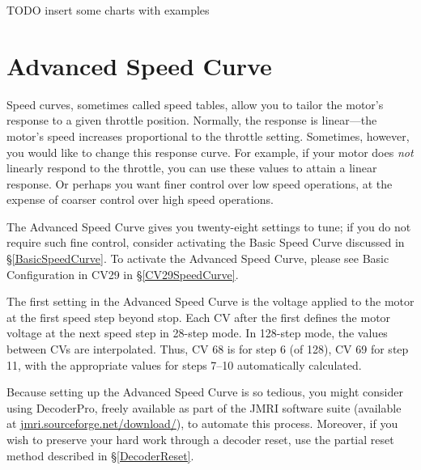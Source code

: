 \documentclass[12pt,letterpaper,draft]{memoir} %
\begin{document}
TODO insert some charts with examples

\section{Advanced Speed Curve}
\label{AdvancedSpeedCurve}

Speed curves, sometimes called speed tables, allow you to tailor the motor's response to a given throttle position. Normally, the response is linear---the motor's speed increases proportional to the throttle setting. Sometimes, however, you would like to change this response curve. For example, if your motor does \textit{not} linearly respond to the throttle, you can use these values to attain a linear response. Or perhaps you want finer control over low speed operations, at the expense of coarser control over high speed operations.

The Advanced Speed Curve gives you twenty-eight settings to tune; if you do not require such fine control, consider activating the Basic Speed Curve discussed in \S\ref{BasicSpeedCurve}. To activate the Advanced Speed Curve, please see Basic Configuration in CV29 in \S\ref{CV29SpeedCurve}.

The first setting in the Advanced Speed Curve is the voltage applied to the motor at the first speed step beyond stop. Each CV after the first defines the motor voltage at the next speed step in 28-step mode. In 128-step mode, the values between CVs are interpolated. Thus, CV 68 is for step 6 (of 128), CV 69 for step 11, with the appropriate values for steps 7--10 automatically calculated.

Because setting up the Advanced Speed Curve is so tedious, you might consider using DecoderPro\textsuperscript{\textregistered}, freely available as part of the JMRI\textsuperscript{\textregistered} software suite (available at \url{jmri.sourceforge.net/download/}), to automate this process. Moreover, if you wish to preserve your hard work through a decoder reset, use the partial reset method described in \S\ref{DecoderReset}.
\end{document}
